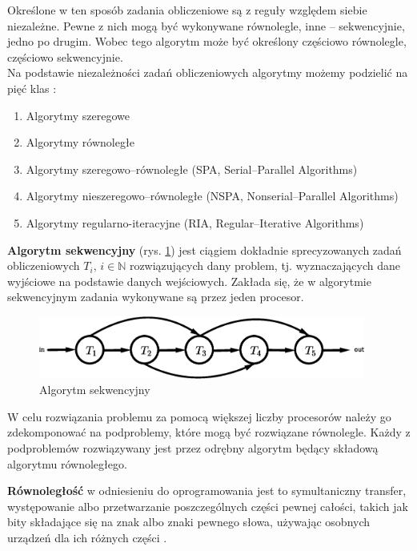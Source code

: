 Określone w ten sposób zadania obliczeniowe są z reguły względem siebie niezależne. Pewne z nich mogą być wykonywane równolegle, inne -- sekwencyjnie, jedno po drugim. Wobec tego algorytm może być określony częściowo równolegle, częściowo sekwencyjnie.\\

Na podstawie niezależności zadań obliczeniowych algorytmy możemy podzielić na pięć klas \cite{APC2011}:
\begin{enumerate}
\item Algorytmy szeregowe
\item Algorytmy równoległe
\item Algorytmy szeregowo--równoległe (SPA, Serial--Parallel Algorithms)
\item Algorytmy nieszeregowo--równoległe (NSPA, Nonserial--Parallel Algorithms)
\item Algorytmy regularno-iteracyjne (RIA, Regular--Iterative Algorithms)
\end{enumerate}





\begin{definicja}\label{def:algorytm_sekwencyjny}
\textbf{Algorytm sekwencyjny} (rys.  \ref{fig:sequential}) jest ciągiem dokładnie sprecyzowanych zadań obliczeniowych \(T_i,\, i\in\mathbb{N}\) rozwiązujących dany problem, tj. wyznaczających dane wyjściowe na podstawie danych wejściowych. Zakłada się, że w algorytmie sekwencyjnym zadania wykonywane są przez jeden procesor.
\end{definicja}

\begin{figure}[h]
\centering
\includegraphics[width=29em]{./images/Rys2.eps}
\caption{Algorytm sekwencyjny}
\label{fig:sequential}
\end{figure}

W celu rozwiązania problemu za pomocą większej liczby procesorów należy go zdekomponować na podproblemy, które mogą być rozwiązane równolegle. Każdy z podproblemów rozwiązywany jest przez odrębny algorytm będący składową algorytmu równoległego.


\begin{definicja}[Równoległość]\label{def:rownoleglosc}
\textbf{Równoległość} w odniesieniu do oprogramowania jest to symultaniczny transfer, występowanie albo przetwarzanie poszczególnych części pewnej całości, takich jak bity składające się na znak albo znaki pewnego słowa, używając osobnych urządzeń dla ich różnych części \cite{IEEE}.
\end{definicja}

